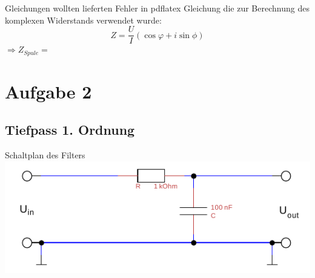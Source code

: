 \documentclass[compress,11pt]{beamer}
\begin{document}
\begin{frame}
Gleichungen wollten lieferten Fehler in pdflatex
Gleichung die zur Berechnung des komplexen Widerstands verwendet wurde:
\begin{equation}
Z=\frac{U}{I}(\cos \varphi +i \sin \phi)
\end{equation}
$\Rightarrow Z_{Spule}=$
\end{frame}

\section{Aufgabe 2}
\subsection{Tiefpass 1. Ordnung}
\begin{frame}
\begin{block}{Schaltplan des Filters}
\includegraphics[width=\textwidth]{../daten/Messdaten/plots/schalt_tief}
\end{block}
\end{frame}
\end{document}
